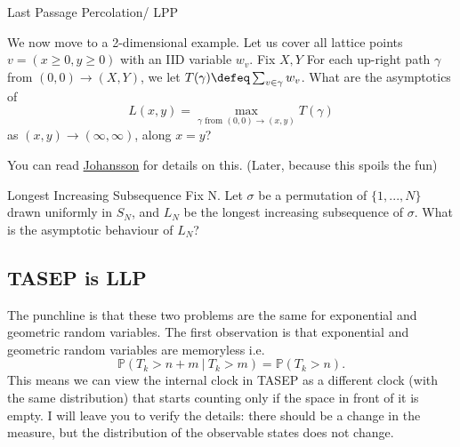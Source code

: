 \begin{aexample}[breakable=false]{Last Passage Percolation/ LPP}{}
    
\begin{center}
    

\end{center}

We now move to a 2-dimensional example. Let us cover all lattice points $v=(x\geq 0,y\geq 0)$ with an IID variable $w_v$. Fix $X,Y$ For each up-right path $\gamma$ from $(0,0) \to (X,Y)$, we let $T(\gamma)\defeq \sum_{v\in \gamma} w_v$.
What are the asymptotics of \[
L(x,y) = \max_{\gamma \text{ from } (0,0)\to (x,y)} T(\gamma)
\]
as $(x,y)\to (\infty,\infty)$, along $x=y$?

\end{aexample}
\begin{remark}
    You can read \href{https://arxiv.org/pdf/math/9903134}{Johansson} for details on this. (Later, because this spoils the fun)
\end{remark}
\begin{aexample}{Longest Increasing Subsequence}{}
    Fix N. Let $\sigma$ be a permutation of $\{1,...,N\}$ drawn uniformly in $S_N$, and $L_N$ be the longest increasing subsequence of $\sigma$. What is the asymptotic behaviour of $L_N$?  
\end{aexample}

\subsection*{TASEP is LLP}
The punchline is that these two problems are the same for exponential and geometric random variables. The first observation is that exponential and geometric random variables are memoryless i.e. \[
\mathbb{P}(T_k>n+m\ |\ T_k>m) = \mathbb{P}(T_k>n).
\]
This means we can view the internal clock in TASEP as a different clock (with the same distribution) that starts counting only if the space in front of it is empty. I will leave you to verify the details: there should be a change in the measure, but the distribution of the observable states does not change.

